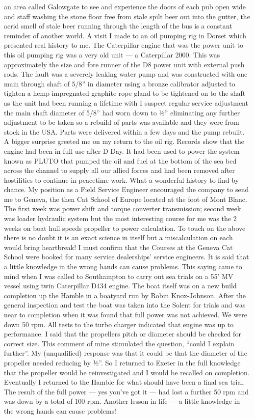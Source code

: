 an area called Galowgate to see and experience the doors of each pub open wide
and staff washing the stone floor free from stale spilt beer out into the
gutter, the acrid smell of stale beer running through the length of the bus is
a constant reminder of another world. A visit I made to an oil pumping rig in
Dorset which presented real history to me.  The Caterpillar engine that was the
power unit to this oil pumping rig was a very old unit --- a Caterpillar 2000.
This was approximately the size and fore runner of the D8 power unit with
external push rods.  The fault was a severely leaking water pump and was
constructed with one main through shaft of 5/8'' in diameter using a bronze
calibrator adjusted to tighten a hemp impregnated graphite rope gland to be
tightened on to the shaft as the unit had been running a lifetime with I
suspect regular service adjustment the main shaft diameter of 5/8'' had worn
down to ½'' eliminating any further adjustment to be taken so a rebuild of
parts was available and they were from stock in the USA.  Parts were delivered
within a few days and the pump rebuilt.  A bigger surprise greeted me on my
return to the oil rig.  Records show that the engine had been in full use after
D Day.  It had been used to power the system known as PLUTO that pumped the oil
and fuel at the bottom of the sea bed across the channel to supply all our
allied forces and had been removed after hostilities to continue in peacetime
work.  What a wonderful history to find by chance. My position as a Field
Service Engineer encouraged the company to send me to Geneva, the then Cat
School of Europe located at the foot of Mont Blanc.  The first week was power
shift and torque converter transmission; second week was loader hydraulic
system but the most interesting course for me was the 2 weeks on boat hull
speeds propeller to power calculation.  To touch on the above there is no doubt
it is an exact science in itself but a miscalculation on each would bring
heartbreak!  I must confirm that the Courses at the Geneva Cat School were
booked for many service dealerships' service engineers. It is said that a
little knowledge in the wrong hands can cause problems.  This saying came to
mind when I was called to Southampton to carry out sea trials on a 55' MV
vessel using twin Caterpillar D434 engine.  The boat itself was on a new build
completion up the Hamble in a boatyard run by Robin Knox-Johnson.  After the
general inspection and test the boat was taken into the Solent for trials and
was near to completion when it was found that full power was not achieved.  We
were down 50 rpm.  All tests to the turbo charger indicated that engine was up
to performance.  I said that the propellers pitch or diameter should be checked
for correct size. This comment of mine stimulated the question, ``could I
explain further''.  My (unqualified) response was that it could be that the
diameter of the propeller needed reducing by ½''.  So I returned to Exeter in
the full knowledge that the propeller would be reinvestigated and I would be
recalled on completion.  Eventually I returned to the Hamble for what should
have been a final sea trial.  The result of the full power --- yes you've got
it --- had lost a further 50 rpm and was down by a total of 100 rpm. Another
lesson in life --- a little knowledge in the wrong hands can cause problems!
